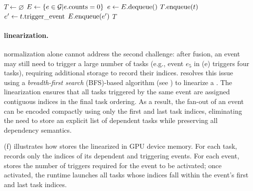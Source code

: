 \begin{algorithm}
\caption{\sys's \graph linearization algorithm. It is guaranteed that each task is enqueued into $T$ once and that each event is enqueued into $E$ once. Lines \ref{line:start}-\ref{line:end} ensure that all tasks depending on an event are consecutive in $T$.}
\label{algo:linearization}
\footnotesize
\begin{algorithmic}[1]
\State $T \gets \varnothing$
\State $E \gets \{e \in \mathcal{G}| e.{\rm counts}=0\}$ 
\State $e \gets E.{\rm dequeue()}$
\label{line:start}
\State $T.{\rm enqueue}(t)$\label{line:end}
\State $e' \gets t.{\rm trigger\_event}$
\State $E.{\rm enqueue}(e')$
\EndIf
\EndIf
\EndFor
\EndWhile
\State
\State \Return $T$
\end{algorithmic}
\end{algorithm}

\paragraph{\graph linearization.} \graph normalization alone cannot address the second challenge: after fusion, an event may still need to trigger a large number of tasks (e.g., event $e_5$ in (e) triggers four tasks), requiring additional storage to record their indices. \sys resolves this issue using a {\em breadth-first search} (BFS)-based algorithm (see ) to linearize a \graph. The linearization ensures that all tasks triggered by the same event are assigned contiguous indices in the final task ordering. As a result, the fan-out of an event can be encoded compactly using only the first and last task indices, eliminating the need to store an explicit list of dependent tasks while preserving all dependency semantics. 

(f) illustrates how \sys stores the linearized \graph in GPU device memory. For each task, \sys records only the indices of its dependent and triggering events. For each event, \sys stores the number of triggers required for the event to be activated; once activated, the runtime launches all tasks whose indices fall within the event’s first and last task indices.

